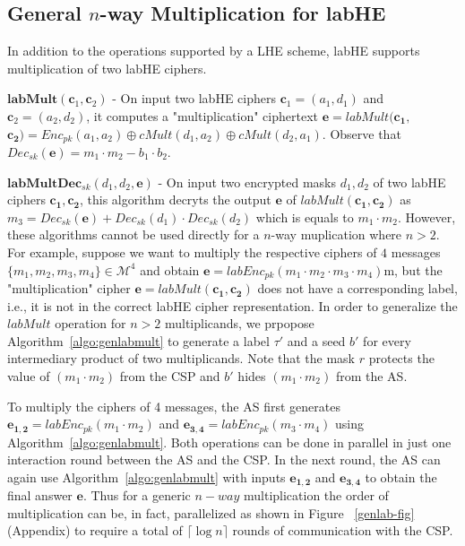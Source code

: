 \subsection{\textbf{General $n$-way Multiplication for \textsf{labHE}}}\label{genlab}
In addition to the operations supported by a \textsf{LHE}  scheme, \textsf{labHE} supports multiplication of two \textsf{labHE} ciphers. 
\squishlist
\item $\textbf{labMult}(\mathbf{c}_1,\mathbf{c}_2)$ - On input two \textsf{labHE} ciphers $\mathbf{c}_1=(a_1,d_1)$ and $\mathbf{c}_2=(a_2,d_2)$, it computes a "multiplication" ciphertext  $\mathbf{e}=labMult(\mathbf{c_1,}$ $\mathbf{c_2})=Enc_{pk}(a_1,a_2)\oplus cMult(d_1,a_2) \oplus cMult(d_2,a_1)$. Observe that $Dec_{sk}(\mathbf{e})=m_1\cdot m_2 -b_1 \cdot b_2$.
\item $\textbf{labMultDec}_{sk}(d_1,d_2,\mathbf{e})$ - On input two encrypted masks $d_1,d_2$ of two \textsf{labHE} ciphers $\mathbf{c_1},\mathbf{c_2}$, this algorithm decryts the output $\mathbf{e}$ of $labMult(\mathbf{c_1},\mathbf{c_2})$ as $m_3=Dec_{sk}(\mathbf{e})+Dec_{sk}(d_1)\cdot Dec_{sk}(d_2)$ which is equals to $m_1\cdot m_2$.   
\squishend
However, these algorithms cannot be used directly for a $n$-way muplication where $n>2$.  For example, suppose we want to multiply the respective ciphers of  $4$ messages $\{m_1,m_2,m_3,m_4\} \in \mathcal{M}^4$ and obtain $\mathbf{e}=labEnc_{pk}(m_1\cdot m_2\cdot m_3 \cdot m_4)$m, but the "multiplication" cipher $\mathbf{e}=labMult(\mathbf{c_1},\mathbf{c_2})$ does not have  a corresponding label, i.e., it is not in the correct \textsf{labHE} cipher representation. In order to generalize the $labMult$ operation for $n>2$ multiplicands, we prpopose Algorithm~\ref{algo:genlabmult} to generate a label $\tau'$ and a seed $b'$ for every intermediary product of two multiplicands. Note that the mask $r$ protects the value of $(m_1\cdot m_2)$ from the \textsf{CSP} and $b'$ hides $(m_1\cdot m_2)$ from the \textsf{AS}. 

To multiply the ciphers of 4 messages, the \textsf{AS} first generates $\mathbf{e_{1,2}}=labEnc_{pk}(m_1\cdot m_2)$ and $\mathbf{e_{3,4}}=labEnc_{pk}(m_3\cdot m_4)$ using Algorithm~\ref{algo:genlabmult}. Both operations can be done in parallel in just one interaction round between the \textsf{AS} and the \textsf{CSP}. In the next round,  the \textsf{AS} can again use Algorithm~\ref{algo:genlabmult} with inputs $\mathbf{e_{1,2}}$ and $\mathbf{e_{3,4}}$ to obtain the final answer $\mathbf{e}$. %
Thus for a generic $n-way$ multiplication the order of multiplication can be, in fact, parallelized as  shown in Figure ~\ref{genlab-fig} (Appendix) to require a total of $\lceil \log n\rceil$ rounds of communication with the \textsf{CSP}.

